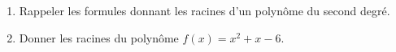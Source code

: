 
\begin{exercice}\label{exoPremiere-0096}

    \begin{enumerate}
        \item
            Rappeler les formules donnant les racines d'un polynôme du second degré.
        \item
            Donner les racines du polynôme \( f(x)=x^2+x-6\).
    \end{enumerate}

\end{exercice}
